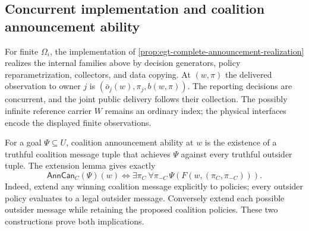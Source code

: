 \documentclass[11pt,a4paper]{article}
\numberwithin{equation}{section}
\theoremstyle{definition}
\theoremstyle{remark}
\theoremstyle{plain}
\begin{document}
\subsection{Concurrent implementation and coalition announcement ability}

For finite $\Omega_i$, the implementation of
\cref{prop:egt-complete-announcement-realization} realizes the internal
families above by decision generators, policy reparametrization, collectors,
and data copying. At $(w,\pi)$ the delivered observation to owner $j$ is
$(\bar o_j(w),\pi_j,b(w,\pi))$. The reporting decisions are concurrent,
and the joint public delivery follows their collection. The possibly
infinite reference carrier $W$ remains an ordinary index; the physical
interfaces encode the displayed finite observations.

For a goal $\Psi\subseteq U$, coalition announcement ability at $w$ is
the existence of a truthful coalition message tuple that achieves $\Psi$
against every truthful outsider tuple. The extension lemma gives exactly
\begin{equation}
 \mathsf{AnnCan}_C(\Psi)(w)
 \iff\exists\pi_C\ \forall\pi_{-C}\,
 \Psi(F(w,(\pi_C,\pi_{-C}))).
 \label{agt-eq-ann-ability}
\end{equation}
Indeed, extend any winning coalition message explicitly to policies; every
outsider policy evaluates to a legal outsider message. Conversely extend
each possible outsider message while retaining the proposed coalition
policies. These two constructions prove both implications.
\end{document}
